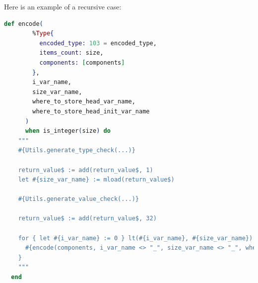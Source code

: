 Here is an example of a recursive case:

\begin{lstlisting}[language=elixir, caption={Encode recursive case}, label={lst:encode_recursive_case}]
  def encode(
        %Type{
          encoded_type: 103 = encoded_type,
          items_count: size,
          components: [components]
        },
        i_var_name,
        size_var_name,
        where_to_store_head_var_name,
        where_to_store_head_init_var_name
      )
      when is_integer(size) do
    """
    #{Utils.generate_type_check(...)}

    return_value$ := add(return_value$, 1)
    let #{size_var_name} := mload(return_value$)

    #{Utils.generate_value_check(...)}

    return_value$ := add(return_value$, 32)

    for { let #{i_var_name} := 0 } lt(#{i_var_name}, #{size_var_name}) { #{i_var_name} := add(#{i_var_name}, 1) } {
      #{encode(components, i_var_name <> "_", size_var_name <> "_", where_to_store_head_var_name, where_to_store_head_init_var_name)}
    }
    """
  end
\end{lstlisting}
    
